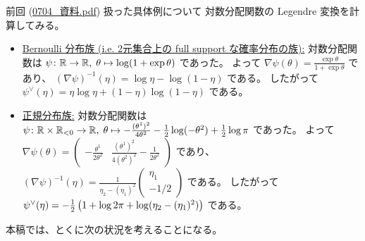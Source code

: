 \documentclass[report]{jlreq}
\begin{document}
\begin{example}
    前回 (\url{0704_資料.pdf}) 扱った具体例について
    対数分配関数の Legendre 変換を計算してみる。
    \begin{itemize}
        \item \uline{Bernoulli 分布族 (i.e. 2元集合上の full support な確率分布の族):} \quad
            対数分配関数は
            $\psi \colon \mathbb{R} \to \mathbb{R}, \; \theta \mapsto \log (1 + \exp \theta)$
            であった。
            よって
            $\nabla \psi(\theta)
                =
                    \frac{\exp \theta}{1 + \exp \theta}$
            であり、
            $(\nabla \psi)^{-1}(\eta)
                =
                    \log \eta - \log (1 - \eta)$
            である。
            したがって
            $\psi^\vee(\eta)
                =
                    \eta \log \eta
                    + (1 - \eta) \log (1 - \eta)$
            である。
        \item \uline{正規分布族:} \quad
            対数分配関数は
            $\psi \colon \mathbb{R} \times \mathbb{R}_{< 0} \to \mathbb{R}, \;
                \theta
                \mapsto
                - \frac{(\theta^1)^2}{4 \theta^2}
                - \frac{1}{2} \log (- \theta^2)
                + \frac{1}{2} \log \pi$
            であった。
            よって
            $\nabla \psi(\theta)
                =
                    \begin{pmatrix}
                        - \frac{\theta^1}{2 \theta^2}
                        &
                        \frac{(\theta^1)^2}{4 (\theta^2)^2} - \frac{1}{2 \theta^2}
                    \end{pmatrix}$
            であり、
            $(\nabla \psi)^{-1}(\eta)
                =
                    \frac{1}{\eta_2 - (\eta_1)^2}
                    \begin{pmatrix}
                        \eta_1
                        \\
                        - 1/2
                    \end{pmatrix}$
            である。
            したがって
            $\psi^\vee(\eta)
                =
                    - \frac{1}{2}
                    \left({
                        1 + \log 2\pi
                        + \log(\eta_2 - (\eta_1)^2)
                    }\right)$
            である。
    \end{itemize}
\end{example}

本稿では、とくに次の状況を考えることになる。
\end{document}
